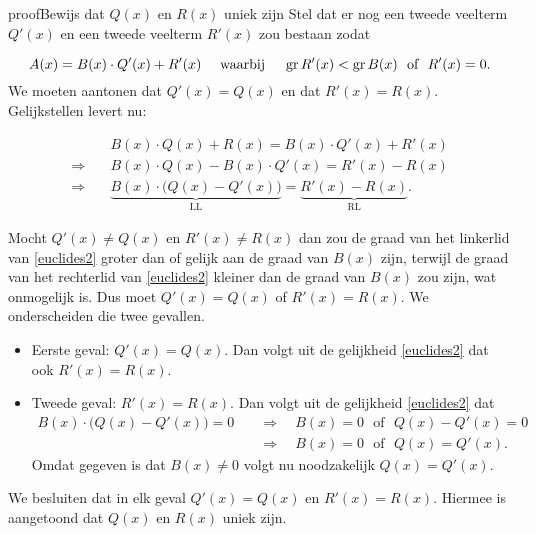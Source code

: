 \documentclass{ximera}
\begin{document}
\begin{expandable}{proof}{Bewijs dat $Q(x)$ en $R(x)$ uniek zijn} 
Stel dat er nog een tweede veelterm $Q'(x)$ en een tweede veelterm $R'(x)$ zou bestaan zodat

\[
A(x) = B(x)\cdot Q'(x) + R'(x) \quad \text{ waarbij } \quad \operatorname{gr} R'(x) < \operatorname{gr} B(x) \,\, \text{ of } \,\, R'(x) = 0.
\]
We moeten aantonen dat $Q'(x) = Q(x)$ en dat $R'(x) = R(x)$. Gelijkstellen levert nu:

\begin{align}
& B(x) \cdot Q(x) + R(x) = B(x) \cdot Q'(x) + R'(x) \\
\Rightarrow \quad & B(x) \cdot Q(x) - B(x) \cdot Q'(x) = R'(x) - R(x) \\ %
\Rightarrow \quad & \underbrace{B(x) \cdot \bigl(Q(x) - Q'(x)\bigr)}_{\text{LL}} = \underbrace{R'(x) - R(x)}_{\text{RL}}. %
\end{align}

Mocht $Q'(x) \neq Q(x)$ en $R'(x) \neq R(x)$ dan zou de graad van het linkerlid van \eqref{euclides2} groter dan of gelijk aan de graad van $B(x)$ zijn, terwijl de graad van het rechterlid van \eqref{euclides2} kleiner dan de graad van $B(x)$ zou zijn, wat onmogelijk is. Dus moet $Q'(x) = Q(x)$ of $R'(x) = R(x)$. We onderscheiden die twee gevallen.
\begin{itemize}
\item[]
Eerste geval: $Q'(x) = Q(x)$. Dan volgt uit de gelijkheid \eqref{euclides2} dat ook $R'(x) = R(x)$.  
\item[]
Tweede geval: $R'(x) = R(x)$. Dan volgt uit de gelijkheid \eqref{euclides2} dat
\begin{align*}
B(x) \cdot \bigl(Q(x) - Q'(x)\bigr) = 0 \quad 
& \Rightarrow \quad B(x) = 0 \,\, \text{ of } \,\, Q(x) - Q'(x) = 0 \\
& \Rightarrow \quad B(x) = 0 \,\, \text{ of } \,\, Q(x) = Q'(x). 
\end{align*}
Omdat gegeven is dat $B(x) \neq 0$ volgt nu noodzakelijk $Q(x) = Q'(x)$.
\end{itemize}
We besluiten dat in elk geval $Q'(x) = Q(x)$ en $R'(x) = R(x)$. Hiermee is aangetoond dat $Q(x)$ en $R(x)$ uniek zijn. 

\end{expandable}
\end{document}
